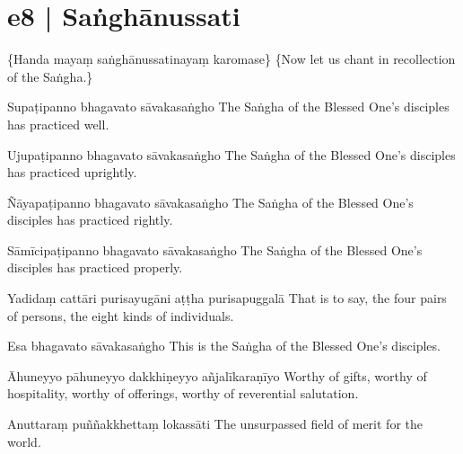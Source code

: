 \section*{e8 | Saṅghānussati}

\begin{chantsubsection}
  \chantnote
    {\{Handa mayaṃ saṅghānussatinayaṃ karomase\}}
  \chantnotetrans
    {\{Now let us chant in recollection of the Saṅgha.\}}
\end{chantsubsection}

\begin{chantsubsection}
  \chantline
    {Supaṭipanno bhagavato sāvakasaṅgho}
    {The Saṅgha of the Blessed One’s disciples has practiced well.}

  \chantline
    {Ujupaṭipanno bhagavato sāvakasaṅgho}
    {The Saṅgha of the Blessed One’s disciples has practiced uprightly.}

  \chantline
    {Ñāyapaṭipanno bhagavato sāvakasaṅgho}
    {The Saṅgha of the Blessed One’s disciples has practiced rightly.}

  \chantline
    {Sāmīcipaṭipanno bhagavato sāvakasaṅgho}
    {The Saṅgha of the Blessed One’s disciples has practiced properly.}

  \chantline
    {Yadidaṃ cattāri purisayugāni aṭṭha purisapuggalā}
    {That is to say, the four pairs of persons, the eight kinds of individuals.}

  \chantline
    {Esa bhagavato sāvakasaṅgho}
    {This is the Saṅgha of the Blessed One’s disciples.}

  \chantline
    {Āhuneyyo pāhuneyyo dakkhiṇeyyo añjalīkaraṇīyo}
    {Worthy of gifts, worthy of hospitality, worthy of offerings, worthy of reverential salutation.}

  \chantline
    {Anuttaraṃ puññakkhettaṃ lokassāti}
    {The unsurpassed field of merit for the world.}
\end{chantsubsection}
